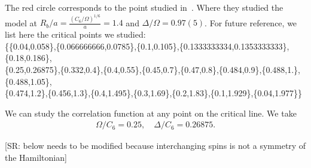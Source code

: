 \documentclass[prb,twocolumn,11pt]{revtex4-1}
\newcommand{\SR}[1]{{\color{red} [SR: #1]}}
\begin{document}
The red circle corresponds to the point studied in~\cite{FangFang:2024eaw}. Where they studied the model at  
$R_b/a=\frac{(C_6/\Omega)^{1/6}}{a}=1.4$ and $\Delta/\Omega=0.97(5)$. 
For future reference, we list here the critical points we studied:
{\\
\{\{0.04,0.058\},\{0.066666666,0.0785\},\{0.1,0.105\},\{0.1333333334,0.1353333333\},\{0.18,0.186\}, \\
\{0.25,0.26875\},\{0.332,0.4\},\{0.4,0.55\},\{0.45,0.7\},\{0.47,0.8\},\{0.484,0.9\},\{0.488,1.\},\{0.488,1.05\},\\
\{0.474,1.2\},\{0.456,1.3\},\{0.4,1.495\},\{0.3,1.69\},\{0.2,1.83\},\{0.1,1.929\},\{0.04,1.977\}\}\\
}


We can study the correlation function at any point on the critical line. We take
\begin{align}
    \Omega/C_6=0.25,\quad \Delta/C_6=0.26875.
\end{align}

\SR{below needs to be modified because interchanging spins is not a symmetry of the Hamiltonian}
\end{document}
